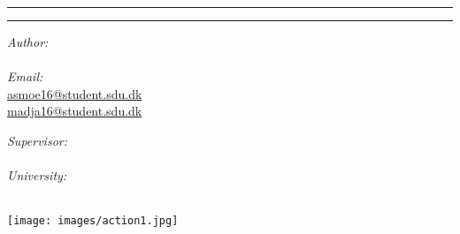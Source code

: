 \documentclass[../main.tex]{subfiles}
\begin{document}
\vspace{3cm}
\hrule
\begin{center}
	{\bf\Huge\Title}
\end{center}
\hrule
\begin{multicols}{2}
	\begin{flushleft}
		\textit{Author:} \\
		\Author\\
		\vspace{10pt}
		\textit{Email:} \\
		\href{asmoe16@student.sdu.dk}{asmoe16@student.sdu.dk}\\
		\href{madja16@student.sdu.dk}{madja16@student.sdu.dk}

	\end{flushleft}
	\columnbreak
	\begin{flushright}
		\textit{Supervisor:} \\
		\Supervisor \\
		\vspace{10pt} 
		\textit{University:}\\
		\University \\
	\end{flushright}
\end{multicols}

\begin{center}
	\texttt{[image: images/action1.jpg]}
\end{center}
\end{document}

